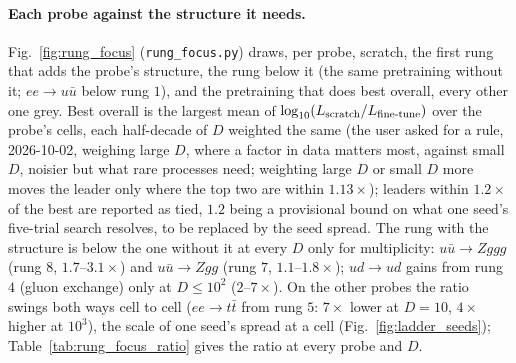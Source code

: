\documentclass[11pt]{article}
\newcommand{\code}[1]{\texttt{#1}}
\begin{document}
\paragraph{Each probe against the structure it needs.} Fig.~\ref{fig:rung_focus} (\code{rung\_focus.py}) draws, per
probe, scratch, the first rung that adds the probe's structure, the rung below it (the same pretraining without it; $ee\to
u\bar u$ below rung $1$), and the pretraining that does best overall, every other one grey. Best overall is the largest mean
of $\log_{10}(L_{\rm scratch}/L_{\rm fine\text{-}tune})$ over the probe's cells, each half-decade of $D$ weighted the same (the
user asked for a rule, 2026-10-02, weighing large $D$, where a factor in data matters most, against small $D$, noisier but
what rare processes need; weighting large $D$ or small $D$ more moves the leader only where the top two are within
$1.13\times$); leaders within $1.2\times$ of the best are reported as tied, $1.2$ being a provisional bound on what one seed's
five-trial search resolves, to be replaced by the seed spread. The rung with the structure is below the one without it
at every $D$ only for multiplicity: $u\bar u\to Zggg$ (rung $8$, $1.7$--$3.1\times$) and $u\bar u\to Zgg$ (rung $7$,
$1.1$--$1.8\times$); $ud\to ud$ gains from rung $4$ (gluon exchange) only at $D\le10^2$ ($2$--$7\times$). On the other
probes the ratio swings both ways cell to cell ($ee\to t\bar t$ from rung $5$: $7\times$ lower at $D=10$, $4\times$
higher at $10^3$), the scale of one seed's spread at a cell (Fig.~\ref{fig:ladder_seeds}); Table~\ref{tab:rung_focus_ratio}
gives the ratio at every probe and $D$.
\end{document}
